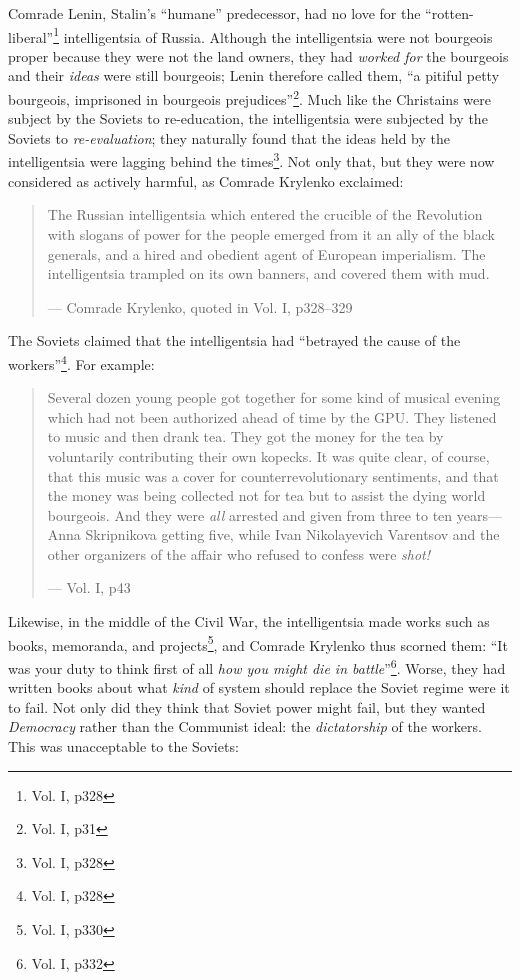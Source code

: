 \documentclass{article}
\begin{document}
Comrade Lenin, Stalin's ``humane'' predecessor, had no love for the ``rotten-liberal''\footnote{Vol. I, p328} intelligentsia of Russia.  Although the intelligentsia were not bourgeois proper because they were not the land owners, they had \emph{worked for} the bourgeois and their \emph{ideas} were still bourgeois; Lenin therefore called them, ``a pitiful petty bourgeois, imprisoned in bourgeois prejudices''\footnote{Vol. I, p31}.  Much like the Christains were subject by the Soviets to re-education, the intelligentsia were subjected by the Soviets to \emph{re-evaluation}; they naturally found that the ideas held by the intelligentsia were lagging behind the times\footnote{Vol. I, p328}.  Not only that, but they were now considered as actively harmful, as Comrade Krylenko exclaimed:

\begin{quote}
The Russian intelligentsia which entered the crucible of the Revolution with slogans of power for the people emerged from it an ally of the black generals, and a hired and obedient agent of European imperialism.  The intelligentsia trampled on its own banners, and covered them with mud.

--- Comrade Krylenko, quoted in Vol. I, p328--329
\end{quote}

The Soviets claimed that the intelligentsia had ``betrayed the cause of the workers''\footnote{Vol. I, p328}.  For example:

\begin{quote}
Several dozen young people got together for some kind of musical evening which had not been authorized ahead of time by the GPU.  They listened to music and then drank tea.  They got the money for the tea by voluntarily contributing their own kopecks.  It was quite clear, of course, that this music was a cover for counterrevolutionary sentiments, and that the money was being collected not for tea but to assist the dying world bourgeois.  And they were \emph{all} arrested and given from three to ten years---Anna Skripnikova getting five, while Ivan Nikolayevich Varentsov and the other organizers of the affair who refused to confess were \emph{shot!}

--- Vol. I, p43
\end{quote}

Likewise, in the middle of the Civil War, the intelligentsia made works such as books, memoranda, and projects\footnote{Vol. I, p330}, and Comrade Krylenko thus scorned them: ``It was your duty to think first of all \emph{how you might die in battle}''\footnote{Vol. I, p332}.  Worse, they had written books about what \emph{kind} of system should replace the Soviet regime were it to fail.  Not only did they think that Soviet power might fail, but they wanted \emph{Democracy} rather than the Communist ideal: the \emph{dictatorship} of the workers.  This was unacceptable to the Soviets:
\end{document}
